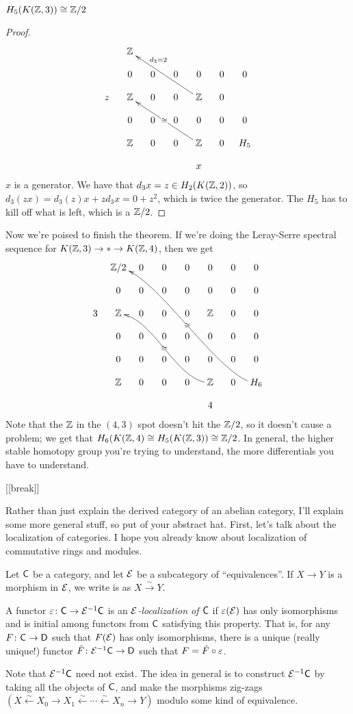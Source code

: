 \begin{corollary}
 $H_5(K(\mathbb{Z},3))\cong \mathbb{Z}/2$
\end{corollary}
\begin{proof}
 \[\xymatrix@!0{
  &\ZZ\\
  &0&0&0&0&0&0\\
  z&\ZZ & 0&0& \ZZ\ar[uulll]_(.7){d_3= 2} & 0 \\
  &0&0&0&0&0&0\\
  &\ZZ & 0&0& \ZZ \ar[uulll]|{\,\cong\,} & 0 & H_5\\
  & & & & x
 }\]
 $x$ is a generator. We have that $d_3 x= z\in H_2(K(\mathbb{Z},2))$, so $d_3(zx)=d_3(z) x + z d_3x = 0 + z^2$, which is twice the generator. The $H_5$ has to kill off what is left, which is a $\mathbb{Z}/2$.
\end{proof}
Now we're poised to finish the theorem. If we're doing the Leray-Serre spectral sequence for $K(\mathbb{Z},3)\to *\to K(\mathbb{Z},4)$, then we get
 \[\xymatrix@!0{
  &\ZZ/2&0&0&0&0&0&0\\
  &0&0&0&0&0&0&0\\
  3&\ZZ&0&0&0&\ZZ&0&0\\
  &0&0&0&0&0&0&0\\
  &0&0&0&0&0&0&0\\
  &\ZZ&0&0&0&\ZZ \ar@(l,r)[uuullll]|{\cong}&0 & H_6 \ar@(l,r)[uuuuullllll]|{\cong}\\
  & & & & & 4
 }\]
Note that the $\mathbb{Z}$ in the $(4,3)$ spot doesn't hit the $\mathbb{Z}/2$, so it doesn't cause a problem; we get that $H_6(K(\mathbb{Z},4)\cong H_5(K(\mathbb{Z},3))\cong \mathbb{Z}/2$. In general, the higher stable homotopy group you're trying to understand, the more differentials you have to understand.

[[break]]


Rather than just explain the derived category of an abelian category, I'll explain some more general stuff, so put of your abstract hat. First, let's talk about the localization of categories. I hope you already know about localization of commutative rings and modules.

Let $\text{\sf C}$ be a category, and let $\mathcal{E}$ be a subcategory of ``equivalences''. If $X\to Y$ is a morphism in $\mathcal{E}$, we write is as $X\xrightarrow\sim Y$.
\begin{definition}
 A functor $\varepsilon\colon\text{\sf C}\to \mathcal{E}^{-1}\text{\sf C}$ is an \emph{$\mathcal{E}$-localization of $\text{\sf C}$} if $\varepsilon(\mathcal{E})$ has only isomorphisms and is initial among functors from $\text{\sf C}$ satisfying this property. That is, for any $F\colon \text{\sf C}\to \text{\sf D}$ such that $F(\mathcal{E})$ has only isomorphisms, there is a unique (really unique!) functor $\tilde F\colon \mathcal{E}^{-1}\text{\sf C}\to \text{\sf D}$ such that $F=\tilde F\circ \varepsilon$.
\end{definition}
Note that $\mathcal{E}^{-1}\text{\sf C}$ need not exist. The idea in general is to construct $\mathcal{E}^{-1}\text{\sf C}$ by taking all the objects of $\text{\sf C}$, and make the morphisms zig-zags $(X\xleftarrow\sim X_0\to X_1\xleftarrow\sim \cdots \xleftarrow\sim X_n \to Y)$ modulo some kind of equivalence.

